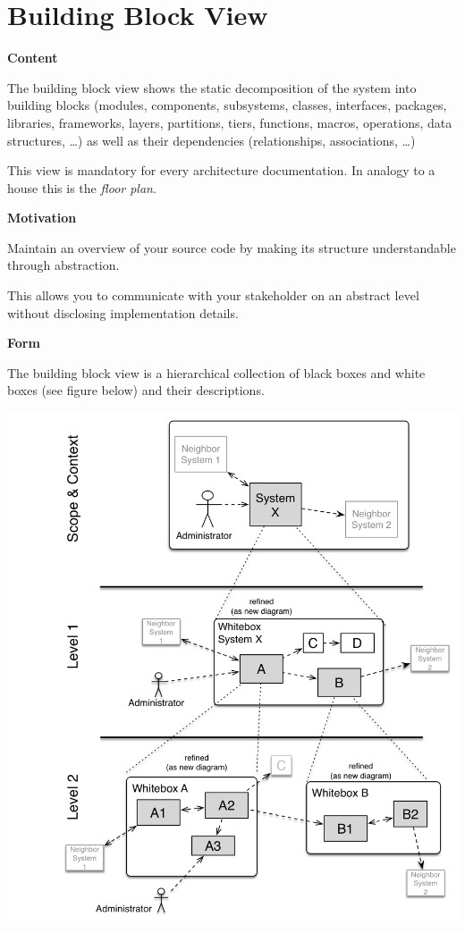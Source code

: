 \hypertarget{section-building-block-view}{%
\section{Building Block View}\label{section-building-block-view}}

\textbf{Content}

The building block view shows the static decomposition of the system
into building blocks (modules, components, subsystems, classes,
interfaces, packages, libraries, frameworks, layers, partitions, tiers,
functions, macros, operations, data structures, \ldots) as well as their
dependencies (relationships, associations, \ldots)

This view is mandatory for every architecture documentation. In analogy
to a house this is the \emph{floor plan}.

\textbf{Motivation}

Maintain an overview of your source code by making its structure
understandable through abstraction.

This allows you to communicate with your stakeholder on an abstract
level without disclosing implementation details.

\textbf{Form}

The building block view is a hierarchical collection of black boxes and
white boxes (see figure below) and their descriptions.

\includegraphics{images/05_building_blocks-EN.png}


